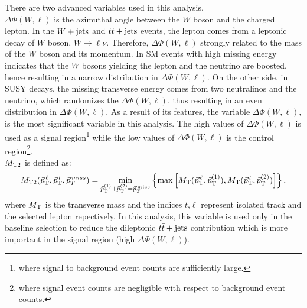 There are two advanced variables used in this analysis.\\
{\boldmath $\Delta\Phi(W,\ell)$} is the azimuthal angle between the $W$ boson and the charged lepton. In the $W+\textrm{jets}$ and $t\bar{t}+\textrm{jets}$ events, the lepton comes from a leptonic decay of $W$ boson, $W\rightarrow\ell\nu$. Therefore, $\Delta\Phi(W,\ell)$ strongly related to the mass of the $W$ boson and its momentum. In SM events with high missing energy indicates that the $W$ bosons yielding the lepton and the neutrino are boosted, hence resulting in a narrow distribution in $\Delta\Phi(W,\ell)$. On the other side, in SUSY decays, the missing transverse energy comes from two neutralinos and the neutrino, which randomizes the  $\Delta\Phi(W,\ell)$, thus resulting in an even distribution in $\Delta\Phi(W,\ell)$. As a result of its features, the variable $\Delta\Phi(W,\ell)$, is the most significant variable in this analysis. The high values of $\Delta\Phi(W,\ell)$ is used as a signal region\footnote{where signal to background event counts are sufficiently large.} while the low values of $\Delta\Phi(W,\ell)$ is the control region\footnote{where signal event counts are negligible with respect to background event counts.}.\\
{\boldmath $M_\mathrm{T2}$}  is defined as:
\begin{eqnarray}
  M_\mathrm{T2}(\vec{p}_{\text T}^{\,\ell},\vec{p}_{\text T}^{\,t},\vec{p}_T^{\,miss}) =
  \min\limits_{\vec{p}_{\text T}^{(1)}+\vec{p}_{\text T}^{(2)} = \vec{p}_T^{\,miss}} \left\{
  \max \left[ M_\mathrm{T}(\vec{p}_{\text T}^{\,\ell}, \vec{p}_{\text T}^{(1)}), 
              M_\mathrm{T}(\vec{p}_{\text T}^{\,t},\vec{p}_{\text T}^{(2)})\right] \right\},
  \label{eq:MT2}
\end{eqnarray}
where $M_\mathrm{T}$ is the transverse mass and the indices $t$,$\ell$ represent isolated track and the selected lepton repectively. In this analysis, this variable is used only in the baseline selection to reduce the dileptonic $t\bar{t}+\textrm{jets}$ contribution which is more important in the signal region (high  $\Delta\Phi(W,\ell)$). 
